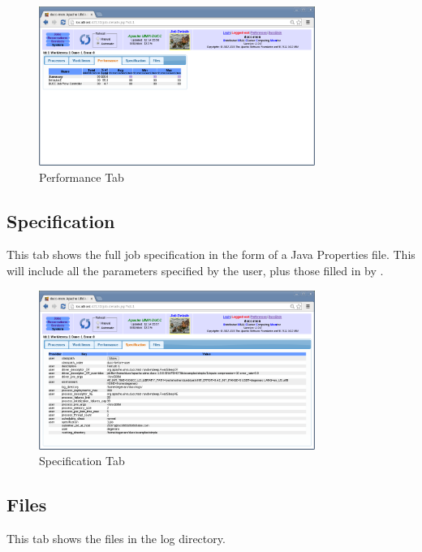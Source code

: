     \begin{figure}[ht!]
    \centering
    \includegraphics[width=90mm]{images/ducc-webserver/Job-Details-Performance.png}
    \caption{Performance Tab}
    \end{figure}  
       
   \subsection{Specification}
   This tab shows the full job specification in the form of a Java Properties
   file.  This will include all the parameters specified by the user, plus those
   filled in by {\DUCC}.
    
    \begin{figure}[ht!]
    \centering
    \includegraphics[width=90mm]{images/ducc-webserver/Job-Details-Specification.png}
    \caption{Specification Tab}
    \end{figure}  
    
   \subsection{Files}
   This tab shows the files in the log directory.
